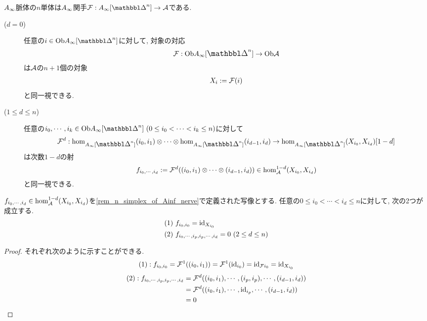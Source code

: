 \documentclass[uplatex, a4paper, 14Q, dvipdfmx]{jsarticle}
\begin{document}
\begin{remark} \label{rem_n_simplex_of_Ainf_nerve}
  $A_{\infty}$脈体の$n$単体は$A_{\infty}$関手$\F : \Ainf[\Prism^n] \to \A$である. 
  \begin{description}
    \item[($d=0$)] 任意の$i \in \Ob\Ainf[\Prism^n]$に対して, 対象の対応
    \begin{align*}
      \F : \Ob\Ainf[\Prism^n] \to \Ob\A
    \end{align*}
    は$\mathcal{A}$の$n+1$個の対象
    \begin{align*}
      X_i := \mathcal{F}(i)
    \end{align*}
    と同一視できる. 
    \item[($1 \leq d \leq n$)] 任意の$i_0,\cdots,i_k \in \Ob\Ainf[\Prism^n] ~ (0 \leq i_0 < \cdots < i_k \leq n)$に対して 
    \begin{align*}
      \F^d : \hom_{\Ainf[\Prism^n]}(i_0,i_1) \otimes \cdots \otimes \hom_{\Ainf[\Prism^n]}(i_{d-1},i_d) \to \hom_{\Ainf[\Prism^n]}(X_{i_0},X_{i_d})[1-d]
    \end{align*}
    は次数$1-d$の射
    \begin{align*}
      f_{i_0,\cdots,i_d} := \mathcal{F}^d((i_0,i_1) \otimes \cdots \otimes (i_{d-1},i_d)) \in \hom_{\mathcal{A}}^{1-d}(X_{i_0},X_{i_d})
    \end{align*}
    と同一視できる.
  \end{description}
\end{remark}

\begin{lemma}
  $f_{i_0,\cdots,i_d} \in \hom_{\mathcal{A}}^{1-d}(X_{i_0},X_{i_d})$を\cref{rem_n_simplex_of_Ainf_nerve}で定義された写像とする. 
  任意の$0 \leq i_0 < \cdots < i_d \leq n$に対して, 次の2つが成立する. 
  \begin{align*}
    &(1) ~ f_{i_0,i_0} = \mathrm{id}_{X_{i_0}} \\ 
    &(2) ~ f_{i_0,\cdots,i_p,i_p,\cdots,i_d} = 0 ~ (2 \leq d \leq n)
  \end{align*}
\end{lemma} 

\begin{proof}
  それぞれ次のように示すことができる.
  \begin{align*}
    (1) : f_{i_0,i_0}
    = \mathcal{F}^1((i_0,i_1)) 
    = \mathcal{F}^1(\mathrm{id}_{i_0}) 
    = \mathrm{id}_{\mathcal{F} i_0} 
    = \mathrm{id}_{X_{i_0}} 
  \end{align*}
  \begin{align*}
    (2) : f_{i_0,\cdots,i_p,i_p,\cdots,i_d}
    &= \mathcal{F}^d((i_0,i_1), \cdots, (i_p,i_p), \cdots, (i_{d-1},i_d)) \\
    &= \mathcal{F}^d((i_0,i_1), \cdots, \mathrm{id}_{i_p}, \cdots, (i_{d-1},i_d)) \\
    &= 0
  \end{align*}
\end{proof}
\end{document}
